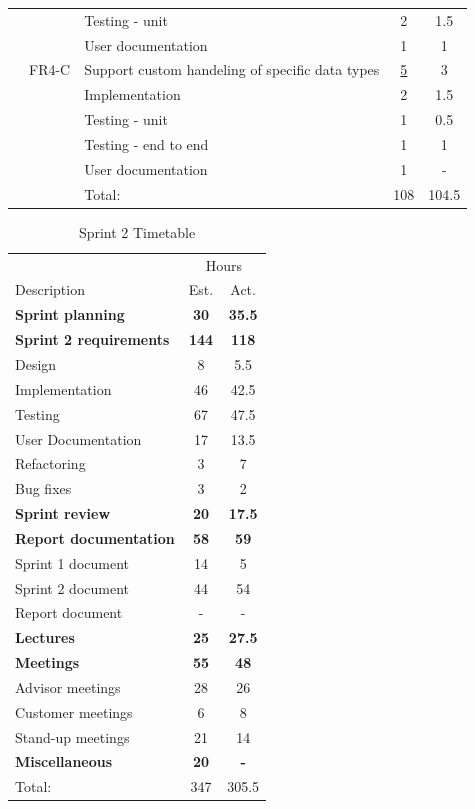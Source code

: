 \begin{table}[!ht]
\begin{tabularx}{\textwidth}{l l X c c}
	   &  & Testing - unit & 2 & 1.5 \\
	   &  & User documentation & 1 & 1 \\
	\addlinespace
	13 & FR4-C & Support custom handeling of specific data types & \underline{ 5 } & 3 \\
	   &  & Implementation & 2 & 1.5 \\
	   &  & Testing - unit & 1 & 0.5 \\
	   &  & Testing - end to end & 1 & 1 \\
	   &  & User documentation & 1 & -\\
	\midrule
	& & Total: & 108 & 104.5 \\
	\bottomrule
\end{tabularx}
\end{table}



\begin{table}[!ht] \small \center
\caption{Sprint 2 Timetable\label{tab:sprint2time}}
\begin{tabularx}{\textwidth}{X c c}
	\toprule
	& \multicolumn{2}{c}{Hours} \\
	\cmidrule(r){2-3}
	Description & Est. & Act. \\
	\midrule
	\textbf{Sprint planning} & \textbf{30} & \textbf{35.5} \\
	\addlinespace
	\textbf{Sprint 2 requirements} & \textbf{144} & \textbf{118} \\
	Design & 8 & 5.5 \\
	Implementation & 46 & 42.5 \\
	Testing & 67 & 47.5 \\
	User Documentation & 17 & 13.5 \\
	Refactoring & 3 & 7 \\
	Bug fixes & 3 & 2 \\
	\addlinespace
	\textbf{Sprint review} & \textbf{20} & \textbf{17.5} \\
	\addlinespace
	\textbf{Report documentation} & \textbf{58} & \textbf{59} \\
	Sprint 1 document & 14 & 5 \\
	Sprint 2 document & 44 & 54 \\
	Report document & - & - \\ %
	\addlinespace
	\textbf{Lectures} & \textbf{25} & \textbf{27.5} \\
	\addlinespace
	\textbf{Meetings} & \textbf{55} & \textbf{48} \\
	Advisor meetings & 28 & 26 \\
	Customer meetings & 6 & 8 \\
	Stand-up meetings & 21 & 14 \\
	\addlinespace
	\textbf{Miscellaneous} & \textbf{20} & \textbf{-} \\ %
	\midrule
	Total: & 347 & 305.5 \\
	\bottomrule
\end{tabularx}
\end{table}


